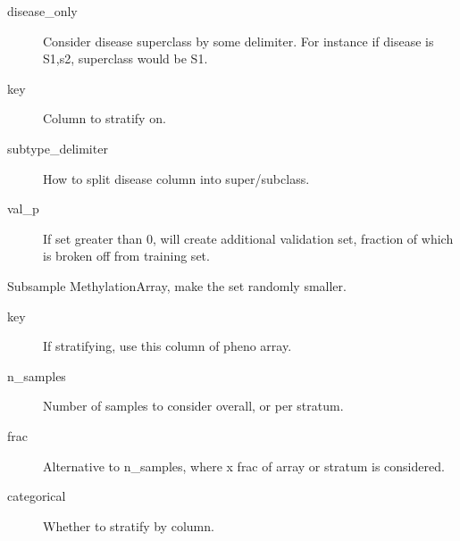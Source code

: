 \documentclass[letterpaper,10pt,english]{sphinxmanual}
\begin{document}
\begin{fulllineitems}
\begin{fulllineitems}
\begin{description}
\item[{disease\_only}] \leavevmode
Consider disease superclass by some delimiter. For instance if disease is S1,s2, superclass would be S1.

\item[{key}] \leavevmode
Column to stratify on.

\item[{subtype\_delimiter}] \leavevmode
How to split disease column into super/subclass.

\item[{val\_p}] \leavevmode
If set greater than 0, will create additional validation set, fraction of which is broken off from training set.

\end{description}

\end{fulllineitems}


\begin{fulllineitems}
\label{\detokenize{index:pymethylprocess.MethylationDataTypes.MethylationArray.subsample}}
Subsample MethylationArray, make the set randomly smaller.
\begin{description}
\item[{key}] \leavevmode
If stratifying, use this column of pheno array.

\item[{n\_samples}] \leavevmode
Number of samples to consider overall, or per stratum.

\item[{frac}] \leavevmode
Alternative to n\_samples, where x frac of array or stratum is considered.

\item[{categorical}] \leavevmode
Whether to stratify by column.

\end{description}

\end{fulllineitems}



\end{fulllineitems}
\end{document}
